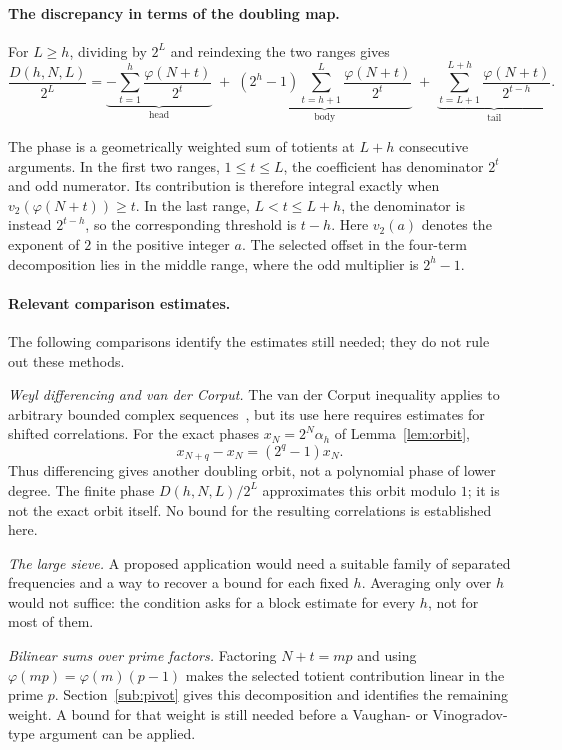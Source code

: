 \documentclass[11pt]{article}
\theoremstyle{plain}
\theoremstyle{definition}
\theoremstyle{remark}
\begin{document}
\paragraph{The discrepancy in terms of the doubling map.}
For $L\ge h$, dividing by $2^L$ and reindexing the two ranges gives
\begin{equation}\label{eq:window}
  \frac{D(h,N,L)}{2^{L}}
  =\underbrace{-\sum_{t=1}^{h}\frac{\varphi(N+t)}{2^{t}}}_{\text{head}}
  \;+\;\underbrace{(2^{h}-1)\sum_{t=h+1}^{L}\frac{\varphi(N+t)}{2^{t}}}_{\text{body}}
  \;+\;\underbrace{\sum_{t=L+1}^{L+h}\frac{\varphi(N+t)}{2^{t-h}}}_{\text{tail}} .
\end{equation}

The phase is a geometrically weighted sum of totients at $L+h$
consecutive arguments. In the first two ranges, $1\le t\le L$, the
coefficient has denominator $2^t$ and odd numerator. Its contribution is
therefore integral exactly when $v_2(\varphi(N+t))\ge t$. In the last range,
$L<t\le L+h$, the denominator is instead $2^{t-h}$, so the corresponding
threshold is $t-h$. Here $v_2(a)$ denotes the exponent of $2$ in the
positive integer $a$. The selected offset in the four-term decomposition
lies in the middle range, where the odd multiplier is $2^h-1$.

\paragraph{Relevant comparison estimates.}
The following comparisons identify the estimates still needed; they do
not rule out these methods.

\emph{Weyl differencing and van der Corput.} The van der Corput inequality
applies to arbitrary bounded complex sequences~\cite[Theorem~2.1]{edeko-vdc},
but its use here requires estimates for shifted correlations. For the exact
phases $x_N=2^N\alpha_h$ of Lemma~\ref{lem:orbit},
\[
 x_{N+q}-x_N=(2^q-1)x_N.
\]
Thus differencing gives another doubling orbit, not a polynomial phase of
lower degree. The finite phase $D(h,N,L)/2^L$ approximates this orbit modulo
$1$; it is not the exact orbit itself. No bound for the resulting
correlations is established here.

\emph{The large sieve.} A proposed application would need a suitable
family of separated frequencies and a way to recover a bound for each
fixed $h$. Averaging only over $h$ would not suffice: the condition asks
for a block estimate for every $h$, not for most of them.

\emph{Bilinear sums over prime factors.} Factoring $N+t=mp$ and using
$\varphi(mp)=\varphi(m)(p-1)$ makes the selected totient contribution linear
in the prime $p$. Section~\ref{sub:pivot} gives this decomposition and
identifies the remaining weight. A bound for that weight is still needed
before a Vaughan- or Vinogradov-type argument can be applied.
\end{document}
